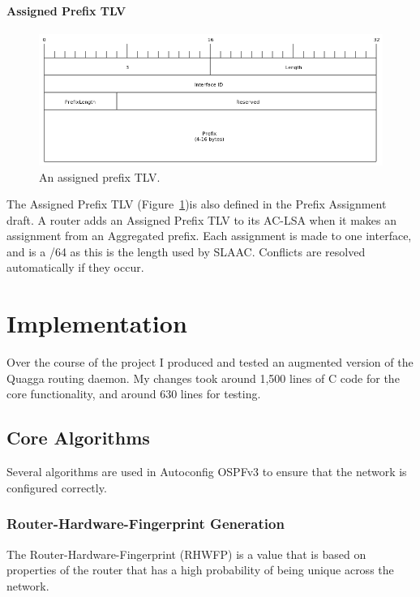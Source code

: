 \documentclass[12pt,a4paper,twoside]{report}
\begin{document}
\subsubsection{Assigned Prefix TLV}
\begin{figure}
\begin{center}
	\includegraphics[width=\linewidth]{../Diagrams/Packets/assigned_prefix_tlv.png}
	\caption{An assigned prefix TLV.}\label{fig:AssignedPrefix-TLV}
\end{center}
\end{figure}
The Assigned Prefix TLV (Figure~\ref{fig:AssignedPrefix-TLV})is also defined in
the Prefix Assignment draft. A router adds an Assigned Prefix TLV to its AC-LSA
when it makes an assignment from an Aggregated prefix. Each assignment is made
to one interface, and is a /64 as this is the length used by SLAAC\@. Conflicts
are resolved automatically if they occur. 

\chapter{Implementation}
Over the course of the project I produced and tested an augmented version of
the Quagga routing daemon. My changes took around 1,500 lines of C code for the
core functionality, and around 630 lines for testing.

\section{Core Algorithms}
Several algorithms are used in Autoconfig OSPFv3 to ensure that the network
is configured correctly.

\subsection{Router-Hardware-Fingerprint Generation}
The Router-Hardware-Fingerprint (RHWFP) is a value that is based on properties of
the router that has a high probability of being unique across the network. 
\end{document}
